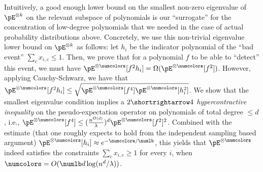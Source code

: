 Intuitively, a good enough lower bound on the smallest non-zero eigenvalue of $\pE^{\otimes k}$ on the relevant subspace of polynomials is our ``surrogate'' for the concentration of low-degree polynomials that we needed in the case of actual probability distributions above. Concretely, we use this non-trivial eigenvalue lower bound on $\pE^{\otimes k}$ as follows: let $h_i$ be the indicator polynomial of the ``bad event'' $\sum_c x_{i,c} \leq 1$. Then, we prove that for a polynomial $f$ to be able to ``detect'' this event, we must have $\pE^{\otimes \numcolors}[f^2 h_i] = \Omega(\pE^{\otimes \numcolors}[f^2])$. However, applying Cauchy-Schwarz, we have that $\pE^{\otimes \numcolors}[f^2 h_i] \leq \sqrt{\pE^{\otimes \numcolors}[f^4] \pE^{\otimes \numcolors}[h_i^2]}$. We show that the smallest eigenvalue condition implies a \emph{$2 \shortrightarrow 4$ hypercontractive inequality} on the pseudo-expectation operator on polynomials of total degree $\leq d$, i.e., $\pE^{\otimes \numcolors}[f^4]  \leq (\frac{n^{O(d)}}{\lambda})^d \pE^{\otimes \numcolors}[f^2]^2$. Combined with the estimate (that one roughly expects to hold from the independent sampling based argument) $\pE^{\otimes \numcolors}[h_i] \approx e^{-\numcolors/\numlb}$, this yields that $\pE^{\otimes \numcolors}$ indeed satisfies the constraints $\sum_{c} x_{i,c} \geq 1$ for every $i$, when $\numcolors = O(\numlb d \log (n^d/\lambda))$.



